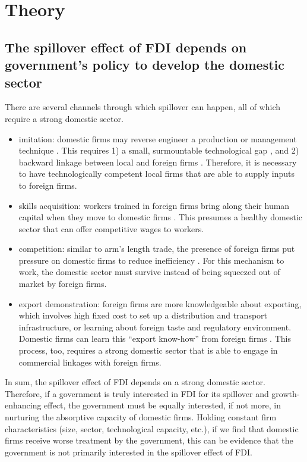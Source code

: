 \documentclass[12pt]{article}
\begin{document}
\section{Theory}

\subsection{The spillover effect of FDI depends on government's policy to develop the domestic sector}

There are several channels through which spillover can happen, all of which require a strong domestic sector.
\begin{itemize}
	\item imitation:  domestic firms may reverse engineer a production or management technique \citep{Wang1992}. This requires 1) a small, surmountable technological gap \citep{Kokko1996}, and 2) backward linkage between local and foreign firms \citep{Javorcik2004}. Therefore, it is necessary to have technologically competent local firms that are able to supply inputs to foreign firms.
	\item skills acquisition: workers trained in foreign firms bring along their human capital when they move to domestic firms \citep{Djankov2000}. This presumes a healthy domestic sector that can offer competitive wages to workers. 
	\item competition: similar to arm's length trade, the presence of foreign firms put pressure on domestic firms to reduce inefficiency \citep{Glass2002}. For this mechanism to work, the domestic sector must survive instead of being squeezed out of market by foreign firms.
	\item export demonstration: foreign firms are more knowledgeable about exporting, which involves high fixed cost to set up a distribution and transport infrastructure, or learning about foreign taste and regulatory environment. Domestic firms can learn this ``export know-how'' from foreign firms \citep{Aitken1997}. This process, too, requires a strong domestic sector that is able to engage in commercial linkages with foreign firms.
\end{itemize}

In sum, the spillover effect of FDI depends on a strong domestic sector. Therefore, if a government is truly interested in FDI for its spillover and growth-enhancing effect, the government must be equally interested, if not more, in nurturing the absorptive capacity of domestic firms. Holding constant firm characteristics (size, sector, technological capacity, etc.), if we find that domestic firms receive worse treatment by the government, this can be evidence that the government is not primarily interested in the spillover effect of FDI.
\end{document}
